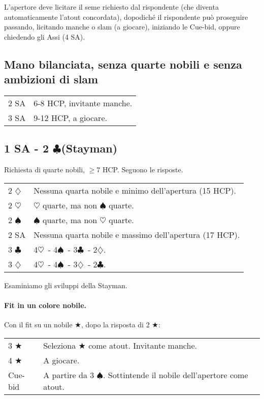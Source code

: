 \documentclass[a4paper,10pt]{article}
\renewcommand{\c}{$\clubsuit$\xspace}
\renewcommand{\d}{$\diamondsuit$\xspace}
\newcommand{\h}{$\heartsuit$\xspace}
\newcommand{\s}{$\spadesuit$\xspace}
\renewcommand{\j}{$\bigstar$\xspace}
\newcommand{\sa}{SA\xspace}
\newcommand{\smallspace}{\vskip0.3cm}
\newenvironment{twocol}
  {\smallspace\noindent\begin{tabular}{l p{0.8\textwidth}}}
  {\end{tabular}\smallspace}
\begin{document}
L'apertore deve licitare il seme richiesto dal rispondente (che diventa automaticamente l'atout concordata), dopodiché il rispondente può proseguire passando, licitando manche o slam (a giocare), iniziando le Cue-bid, oppure chiedendo gli Assi (4 \sa).


\subsection{Mano bilanciata, senza quarte nobili e senza ambizioni di slam}

\begin{twocol}
 2 \sa & 6-8 HCP, invitante manche.\\
 3 \sa & 9-12 HCP, a giocare.
\end{twocol}


\subsection{1 SA - 2 \c (Stayman)}

Richiesta di quarte nobili, $\geq 7$ HCP. Seguono le risposte.

\begin{twocol}
 2 \d & Nessuna quarta nobile e minimo dell'apertura (15 HCP).\\
 2 \h & \h quarte, ma non \s quarte.\\
 2 \s & \s quarte, ma non \h quarte.\\
 2 SA & Nessuna quarta nobile e massimo dell'apertura (17 HCP).\\
 3 \c & 4\h\ - 4\s\ - 3\c\ - 2\d.\\
 3 \d & 4\h\ - 4\s\ - 3\d\ - 2\c.\\
\end{twocol}

\noindent Esaminiamo gli sviluppi della Stayman.

\paragraph{Fit in un colore nobile.}

Con il fit su un nobile \j, dopo la risposta di 2 \j:
\begin{twocol}
 3 \j & Seleziona \j come atout. Invitante manche.\\
 4 \j & A giocare.\\
 Cue-bid & A partire da 3 \s. Sottintende il nobile dell'apertore come atout.\\
\end{twocol}
\end{document}
